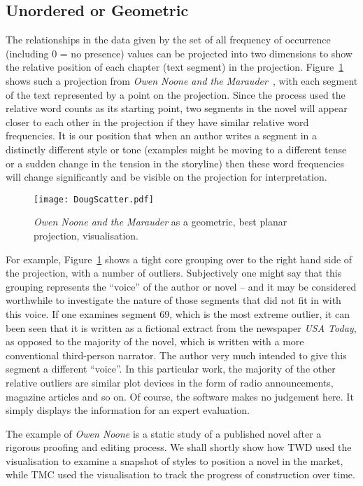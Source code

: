 \documentclass{article}
\begin{document}
\subsection{Unordered or Geometric}
The relationships in the data given by the set of all frequency of occurrence (including 0 = no presence) values can be projected into two dimensions to show the relative position of each chapter (text segment) in the projection. Figure~\ref{default} shows such a projection from {\em Owen Noone and the Marauder}~\cite{Cowie200502}, with each segment of the text represented by a point on the projection.  Since the process used the relative word counts as its starting point, two segments in the novel will appear closer to each other in the projection if they have similar relative word frequencies. It is our position that when an author writes a segment in a distinctly different style or tone (examples might be moving to a different tense or a sudden change in the tension in the storyline) then these word frequencies will change significantly and be visible on the projection for interpretation.  
\begin{figure}
\begin{center}
\texttt{[image: DougScatter.pdf]}
\caption{{\em Owen Noone and the Marauder} as a geometric, 
best planar projection, visualisation.}
\label{default}
\end{center}
\end{figure}

For example, Figure~\ref{default} shows a tight core grouping over to the right hand side of the projection, with a number of outliers. Subjectively one might say that this grouping represents the ``voice'' of the author or novel -- and it may be considered worthwhile to investigate the nature of those segments that did not fit in with this voice. If one examines segment 69, 
which is the most extreme outlier, it can been seen that it is written as a fictional extract from the newspaper {\em USA Today}, as opposed to the majority of the novel, which is written with a more conventional third-person narrator.  The author very much intended to give this segment a different ``voice''. In this particular work, the majority of the other relative outliers are similar plot devices in the form of radio announcements, magazine articles and so on.   Of course, the software makes no judgement here. It simply displays the information for an expert evaluation. 

The example of {\em Owen Noone} is a static study of a published novel after a rigorous proofing and editing process. We shall shortly show how TWD used the visualisation to examine a snapshot of styles to position a novel in the market, while TMC used the visualisation to track the progress of construction over time.  
\end{document}
